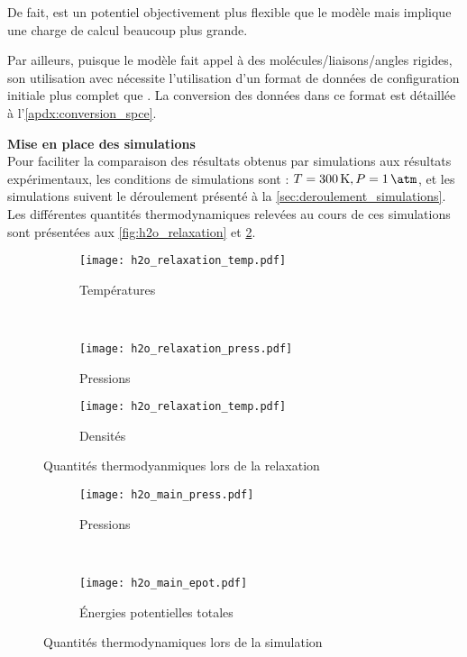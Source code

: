 De fait, \reaxff{} est un potentiel objectivement plus flexible que le modèle \spce{} mais implique une charge de calcul beaucoup plus grande.

Par ailleurs, puisque le modèle \spce{} fait appel à des molécules/liaisons/angles rigides, son utilisation avec \lammps{} nécessite l'utilisation d'un format de données de configuration initiale plus complet que \reaxff{}. La conversion des données dans ce format est détaillée à l'\autoref{apdx:conversion_spce}.

\textbf{Mise en place des simulations}\\
Pour faciliter la comparaison des résultats obtenus par simulations aux résultats expérimentaux, les conditions de simulations sont : $T = \qty{300}{\kelvin}, P = \qty{1}{\atm}$, et les simulations suivent le déroulement présenté à la \autoref{sec:deroulement_simulations}. Les différentes quantités thermodynamiques relevées au cours de ces simulations sont présentées aux \autoref{fig:h2o_relaxation} et \ref{fig:h2o_main}.

\begin{figure}[h!]
    \centering
    \begin{subfigure}{.49\textwidth}
        \texttt{[image: h2o\_relaxation\_temp.pdf]}
        \caption{Températures}
    \end{subfigure}%
    ~
    \begin{subfigure}{.49\textwidth}
        \texttt{[image: h2o\_relaxation\_press.pdf]}
        \caption{Pressions}
    \end{subfigure}
    \begin{subfigure}{.49\textwidth}
        \texttt{[image: h2o\_relaxation\_temp.pdf]}
        \caption{Densités}
    \end{subfigure}
    \caption{Quantités thermodyanmiques lors de la relaxation}
    \label{fig:h2o_relaxation}
\end{figure}

\begin{figure}[h!]
    \centering
    \begin{subfigure}{.49\textwidth}
        \texttt{[image: h2o\_main\_press.pdf]}
        \caption{Pressions}
    \end{subfigure}%
    ~
    \begin{subfigure}{.49\textwidth}
        \texttt{[image: h2o\_main\_epot.pdf]}
        \caption{Énergies potentielles totales}
    \end{subfigure}
    \caption{Quantités thermodynamiques lors de la simulation}
    \label{fig:h2o_main}
\end{figure}

